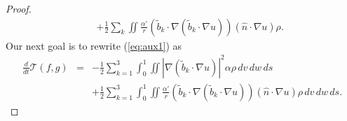 \documentclass[11pt]{amsart}
\numberwithin{equation}{section}
\begin{document}
\begin{proof}
\begin{eqnarray}
  && +\frac{1}{2}\sum_{k}\iint\frac{\alpha'}{r}\left(\tilde{b}_{k}\cdot\nabla\left(\tilde{b}_{k}\cdot\nabla u\right)\right)\left(\hat{n}\cdot\nabla u\right)\rho. \label{eq:aux1}
\end{eqnarray}
% 
Our next goal is to rewrite (\ref{eq:aux1}) as 
%
\begin{eqnarray}
  \frac{d}{dt}\mathcal{T}(f,g)&=&-\frac{1}{2}\sum_{k=1}^{3}\int_{0}^{1}\iint\left|\nabla\left(\tilde{b}_{k}\cdot\nabla u\right)\right|^{2}\alpha\rho\,dv\,dw\,ds\nonumber\\
  & & +\frac{1}{2}\sum_{k=1}^{3} \int_0^1\iint\frac{\alpha'}{r}\left(\tilde{b}_{k}\cdot\nabla\left(\tilde{b}_{k}\cdot\nabla u\right)\right)\left(\hat{n}\cdot\nabla u\right)\rho\,dv\,dw\,ds.\label{eq:final_dissipation}
\end{eqnarray}



\end{proof}
\end{document}
